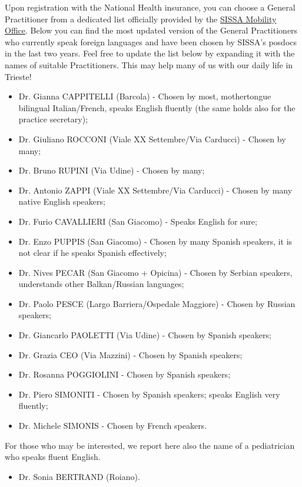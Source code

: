 \documentclass{sissavademecum}
\begin{document}
Upon registration with the National Health insurance, you can choose a General Practitioner from a dedicated list officially provided by the \href{mobility@sissa.it}{SISSA Mobility Office}. Below you can find the most updated version of the General Practitioners who currently speak foreign languages and have been chosen by SISSA's posdocs in the last two years. Feel free to update the list below by expanding it with the names of suitable Practitioners. This may help many of us with our daily life in Trieste!
\begin{itemize}
    \item Dr. Gianna CAPPITELLI (Barcola) - Chosen by most, mothertongue bilingual Italian/French, speaks English fluently (the same holds also for the practice secretary);
    \item Dr. Giuliano ROCCONI (Viale XX Settembre/Via Carducci) - Chosen by many;
    \item Dr. Bruno RUPINI (Via Udine) - Chosen by many;
    \item Dr. Antonio ZAPPI (Viale XX Settembre/Via Carducci) - Chosen by many native English speakers;
    \item Dr. Furio CAVALLIERI (San Giacomo) - Speaks English for sure;
    \item Dr. Enzo PUPPIS (San Giacomo) - Chosen by many Spanish speakers, it is not clear if he speaks Spanish effectively;
    \item Dr. Nives PECAR (San Giacomo + Opicina) - Chosen by Serbian speakers, understands other Balkan/Russian languages;
    \item Dr. Paolo PESCE (Largo Barriera/Ospedale Maggiore) - Chosen by Russian speakers;
    \item Dr. Giancarlo PAOLETTI (Via Udine) - Chosen by Spanish speakers;
    \item Dr. Grazia CEO (Via Mazzini) - Chosen by Spanish speakers;
    \item Dr. Rosanna POGGIOLINI - Chosen by Spanish speakers;
    \item Dr. Piero SIMONITI - Chosen by Spanish speakers; speaks English very fluently;
    \item Dr. Michele SIMONIS - Chosen by French speakers.
\end{itemize}
For those who may be interested, we report here also the name of a pediatrician who speaks fluent English.
\begin{itemize}
    \item Dr. Sonia BERTRAND (Roiano).
\end{itemize}
\end{document}
